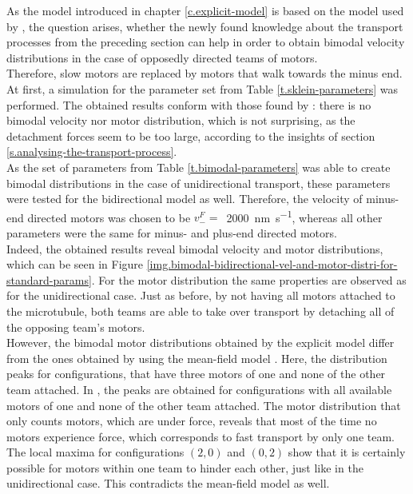 As the model introduced in chapter \ref{c.explicit-model} is based on the model used by \cite{sklein}, the question arises, whether the newly found knowledge about the transport processes from the
preceding section can help in order to obtain bimodal velocity distributions in the case of opposedly directed teams of motors. \\ 
Therefore, slow motors are replaced by motors that walk towards the minus end. At first, a simulation for the parameter set from Table \ref{t.sklein-parameters} was performed. The obtained results
conform with those found by \cite{sklein}: there is no bimodal velocity nor motor distribution, which is not surprising, as the detachment forces seem to be too large, according to the insights of
section \ref{s.analysing-the-transport-process}. \\
As the set of parameters from Table \ref{t.bimodal-parameters} was able to create bimodal distributions in the case of unidirectional transport, these parameters were tested for the bidirectional
model as well. Therefore, the velocity of minus-end directed motors was chosen to be \mbox{$v_-^F =$ \SI{2000}{\nano\metre\per\second}}, whereas all other parameters were the same for minus- and
plus-end directed motors. \\
Indeed, the obtained results reveal bimodal velocity and motor distributions, which can be seen in Figure \ref{img.bimodal-bidirectional-vel-and-motor-distri-for-standard-params}. For the motor
distribution the same properties are observed as for the unidirectional case. Just as before, by not having all motors attached to the microtubule, both teams are able to take over transport by 
detaching all of the opposing team's motors. \\
However, the bimodal motor distributions obtained by the explicit model differ from the ones obtained by using the mean-field model \cite{pnas105}. Here, the distribution peaks for configurations,
that have three motors of one and none of the other team attached. In \cite{pnas105}, the peaks are obtained for configurations with all available motors of one and none of the other team attached.
The motor distribution that only counts motors, which are under force, reveals that most of the time no motors experience force, which corresponds to fast transport by only one team. The local
maxima for configurations \mbox{$\left(2, 0\right)$} and \mbox{$\left(0, 2\right)$} show that it is certainly possible for motors within one team to hinder each other, just like in the
unidirectional case. This contradicts the mean-field model as well.

